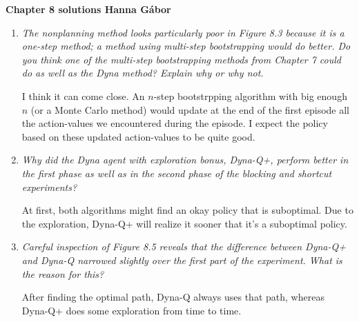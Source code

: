 \documentclass[12pt,a4paper]{article}
\begin{document}
\textbf{Chapter 8 solutions  \hfill Hanna Gábor}

\begin{enumerate}
  \item
    \textit{The nonplanning method looks particularly poor in Figure 8.3 because it is
    a one-step method; a method using multi-step bootstrapping would do better. Do you
    think one of the multi-step bootstrapping methods from Chapter 7 could do as well as
    the Dyna method? Explain why or why not.}

    I think it can come close. An $n$-step bootstrpping algorithm with big enough $n$ (or a
    Monte Carlo method) would update at the end of the first episode all the action-values we
    encountered during the episode.
    I expect the policy based on these updated action-values to be quite good.

  \item
    \textit{Why did the Dyna agent with exploration bonus, Dyna-Q+, perform
    better in the first phase as well as in the second phase of the blocking and shortcut
    experiments?}

    At first, both algorithms might find an okay policy that is suboptimal. Due
    to the exploration, Dyna-Q+ will realize it sooner that it's a suboptimal policy.

  \item
    \textit{Careful inspection of Figure 8.5 reveals that the difference between Dyna-Q+
    and Dyna-Q narrowed slightly over the first part of the experiment. What is the reason
    for this?}

    After finding the optimal path, Dyna-Q always uses that path, whereas Dyna-Q+
    does some exploration from time to time.
\end{enumerate}
\end{document}
